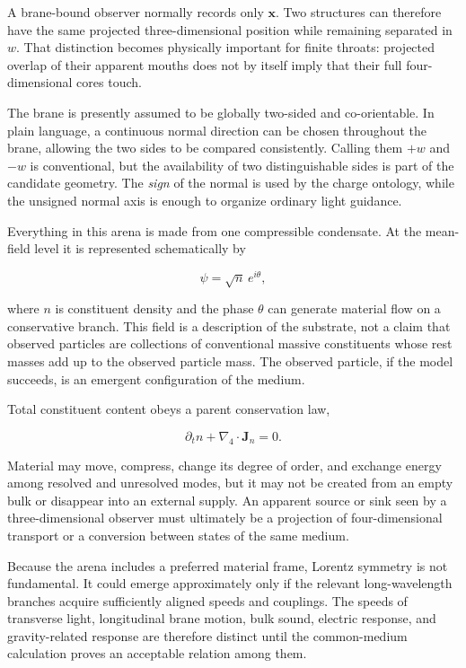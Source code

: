 A brane-bound observer normally records only \(\mathbf x\). Two structures can
therefore have the same projected three-dimensional position while remaining
separated in \(w\). That distinction becomes physically important for finite
throats: projected overlap of their apparent mouths does not by itself imply
that their full four-dimensional cores touch.

The brane is presently assumed to be globally two-sided and co-orientable. In
plain language, a continuous normal direction can be chosen throughout the
brane, allowing the two sides to be compared consistently. Calling them \(+w\)
and \(-w\) is conventional, but the availability of two distinguishable sides
is part of the candidate geometry. The \emph{sign} of the normal is used by the
charge ontology, while the unsigned normal axis is enough to organize ordinary
light guidance.

Everything in this arena is made from one compressible condensate. At the
mean-field level it is represented schematically by

\[
\psi=\sqrt n\,e^{i\theta},
\]

where \(n\) is constituent density and the phase \(\theta\) can generate
material flow on a conservative branch. This field is a description of the
substrate, not a claim that observed particles are collections of conventional
massive constituents whose rest masses add up to the observed particle mass.
The observed particle, if the model succeeds, is an emergent configuration of
the medium.

Total constituent content obeys a parent conservation law,

\[
\partial_t n+\nabla_4\!\cdot\mathbf J_n=0.
\]

Material may move, compress, change its degree of order, and exchange energy
among resolved and unresolved modes, but it may not be created from an empty
bulk or disappear into an external supply. An apparent source or sink seen by a
three-dimensional observer must ultimately be a projection of four-dimensional
transport or a conversion between states of the same medium.

Because the arena includes a preferred material frame, Lorentz symmetry is not
fundamental. It could emerge approximately only if the relevant long-wavelength
branches acquire sufficiently aligned speeds and couplings. The speeds of
transverse light, longitudinal brane motion, bulk sound, electric response, and
gravity-related response are therefore distinct until the common-medium
calculation proves an acceptable relation among them.

